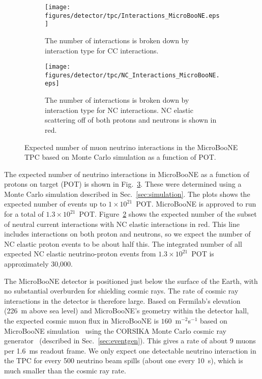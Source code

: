   \begin{figure}[h]
    \centering
    \begin{subfigure}[t]{2.5in}
      \texttt{[image: figures/detector/tpc/Interactions\_MicroBooNE.eps]}
      \caption{The number of interactions is broken down by interaction type
      for CC interactions.}
      \label{fig:interactionsal}
    \end{subfigure}
    \hspace{2pt}
    \begin{subfigure}[t]{2.5in}
      \texttt{[image: figures/detector/tpc/NC\_Interactions\_MicroBooNE.eps]}
      \caption{The number of interactions is broken down by interaction type
      for NC interactions. NC elastic scattering off of both protons and
      neutrons is shown in red.}
      \label{fig:interactionsnc}
    \end{subfigure}
    \caption{Expected number of muon neutrino interactions in the
    MicroBooNE TPC based on Monte Carlo simulation as a function of POT.}
    \label{fig:interactions}
  \end{figure}

  The expected number of neutrino interactions in MicroBooNE as a function of
  protons on target (POT) is shown in Fig.~\ref{fig:interactions}. These were
  determined using a Monte Carlo simulation described in
  Sec.~\ref{sec:simulation}. The plots shows the expected number of events up
  to $1\times 10^{21}$~POT. MicroBooNE is approved to run for a total of
  $1.3\times 10^{21}$~POT. Figure~\ref{fig:interactionsnc} shows the expected
  number of the subset of neutral current interactions with NC elastic
  interactions in red. This line includes interactions on both proton and
  neutrons, so we expect the number of NC elastic proton events to be about
  half this. The integrated number of all expected NC elastic neutrino-proton
  events from $1.3\times 10^{21}$~POT is approximately 30,000.

  The MicroBooNE detector is positioned just below the surface of the Earth,
  with no substantial overburden for shielding cosmic rays. The rate of cosmic
  ray interactions in the detector is therefore large. Based on Fermilab's
  elevation (226~m above sea level) and MicroBooNE's geometry within the
  detector hall, the expected cosmic muon flux in MicroBooNE is
  $160$~m$^{-2}$s$^{-1}$ based on MicroBooNE simulation~\cite{uBCosmicNote}
  using the CORSIKA Monte Carlo cosmic ray generator~\cite{Heck:1998vt}
  (described in Sec.~\ref{sec:eventgen}). This gives a rate of about 9 muons
  per 1.6~ms readout frame. We only expect one detectable neutrino interaction
  in the TPC for every 500 neutrino beam spills (about one every 10~s), which
  is much smaller than the cosmic ray rate.

